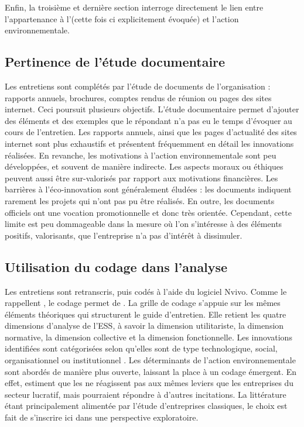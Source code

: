     Enfin, la troisième et dernière section interroge directement le lien entre l'appartenance à l'\ess (cette fois ci explicitement évoquée) et l'action environnementale.


\subsection{Pertinence de l’étude documentaire}
    Les entretiens sont complétés par l'étude de documents de l'organisation : rapports annuels, brochures, comptes rendus de réunion ou pages des sites internet. Ceci poursuit plusieurs objectifs. L'étude documentaire permet d'ajouter des éléments et des exemples que le répondant n'a pas eu le temps d'évoquer au cours de l'entretien. Les rapports annuels, ainsi que les pages d'actualité des sites internet sont plus exhaustifs et présentent fréquemment en détail les innovations réalisées. En revanche, les motivations à l'action environnementale sont peu développées, et souvent de manière indirecte. Les aspects moraux ou éthiques peuvent aussi être sur-valorisés par rapport aux motivations financières. Les barrières à l'éco-innovation sont généralement éludées : les documents indiquent rarement les projets qui n'ont pas pu être réalisés. En outre, les documents officiels ont une vocation promotionnelle et donc très orientée. Cependant, cette limite est peu dommageable dans la mesure où l'on s'intéresse à des éléments positifs, valorisants, que l'entreprise n'a pas d'intérêt à dissimuler.


\subsection{Utilisation du codage dans l'analyse}
    Les entretiens sont retranscris, puis codés à l'aide du logiciel Nvivo. Comme le rappellent \textcite[][p.90]{miles2014qualitative}, le codage permet de .
    La grille de codage s'appuie sur les mêmes éléments théoriques qui structurent le guide d'entretien. Elle retient les quatre dimensions d'analyse de l'ESS, à savoir la dimension utilitariste, la dimension normative, la dimension collective et la dimension fonctionnelle. Les innovations identifiées sont catégorisées selon qu'elles sont de type technologique, social, organisationnel ou institutionnel \parencite{rennings2000redefining}. Les déterminants de l'action environnementale sont abordés de manière plus ouverte, laissant la place à un codage émergent. En effet, \textcite{dart2010green} estiment que les \oess ne réagissent pas aux mêmes leviers que les entreprises du secteur lucratif, mais pourraient répondre à d'autres incitations. La littérature étant principalement alimentée par l'étude d'entreprises classiques, le choix est fait de s'inscrire ici dans une perspective exploratoire. \\

